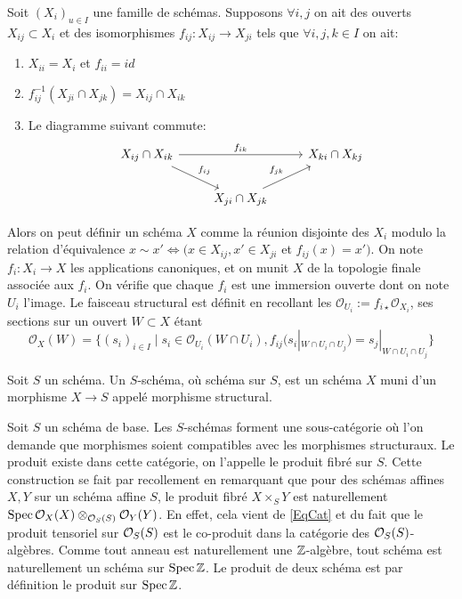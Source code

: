\begin{cons}\label{gluevar}
Soit $(X_i)_{u\in I}$ une famille de schémas. Supposons $\forall i,j$ on ait des ouverts $X_{ij}\subset X_i$ et des isomorphismes $f_{ij}:X_{ij}\rightarrow X_{ji}$ tels que $\forall i,j,k\in I$ on ait:
	\begin{enumerate}
	\item $X_{ii}=X_i$ et $f_{ii}=id$
	\item $f_{ij}^{-1}(X_{ji} \cap X_{jk}) =  X_{ij} \cap X_{ik}$
	\item Le diagramme suivant commute:
	$$
		\begin{tikzcd}
		  X_{ij}\cap X_{ik} \arrow[rd, "f_{ij}"] \arrow[rr, "f_{ik}"] & & X_{ki}\cap X_{kj}\\
  		 & X_{ji}\cap X_{jk} \arrow[ru, "f_{jk}"] &
	\end{tikzcd}
	$$
	\end{enumerate}
Alors on peut définir un schéma $X$ comme la réunion disjointe des $X_i$ modulo la relation d'équivalence $x\sim x' \iff (x\in X_{ij}, x'\in X_{ji}$ et $f_{ij}(x)=x')$. On note $f_i:X_i\rightarrow X$ les applications canoniques, et on munit 
$X$ de la topologie finale associée aux $f_i$. On vérifie que chaque $f_i$ est une immersion ouverte dont on note $U_i$ l'image. Le faisceau structural est définit en recollant les $\mathcal{O}_{U_i}:=f_{i\star}\mathcal{O}_{X_i}$, ses sections sur un ouvert $W\subset X$ étant $$
\mathcal{O}_X(W) =
\{
(s_i)_{i \in I} \mid
s_i \in \mathcal{O}_{U_i}(W \cap U_i),
f_{ij}(s_i|_{W \cap U_i \cap U_j}) = s_j|_{W \cap U_i \cap U_j}
\}
$$
\end{cons}


\begin{defn}
Soit $S$ un schéma. Un $S$-schéma, où schéma sur $S$, est un schéma $X$ muni d'un morphisme $X\rightarrow S$ appelé morphisme structural.
\end{defn}

Soit $S$ un schéma de base. Les $S$-schémas forment une sous-catégorie où l'on demande que morphismes soient compatibles avec les morphismes structuraux. Le produit existe dans cette catégorie, on l'appelle le produit fibré sur $S$. Cette construction se fait par recollement en remarquant que pour des schémas affines $X,Y$ sur un schéma affine $S$, le produit fibré $X\times_S Y$ est naturellement $\operatorname{Spec} \mathcal{O}_X(X)\otimes_{\mathcal{O}_S(S)}\mathcal{O}_Y(Y)$. En effet, cela vient de \ref{EqCat} et du fait que le produit tensoriel sur $\mathcal{O}_S(S)$ est le co-produit dans la catégorie des $\mathcal{O}_S(S)$-algèbres. 
Comme tout anneau est naturellement une $\mathbb{Z}$-algèbre, tout schéma est naturellement un schéma sur $\operatorname{Spec} \mathbb{Z}$. Le produit de deux schéma est par définition le produit sur $\operatorname{Spec} \mathbb{Z}$.

